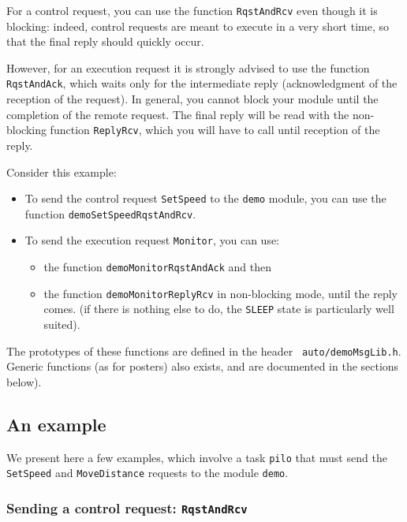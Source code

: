 For a  control request, you  can use  the function  {\tt RqstAndRcv} even
though it is blocking: indeed, control requests are meant to execute in a
very short time, so that the final reply should quickly occur.

However, for  an  execution request it   is strongly advised   to use the
function {\tt  RqstAndAck}, which waits only  for the  intermediate reply
(acknowledgment of the reception of the request).  In general, you cannot
block your module until the completion of the  remote request.  The final
reply will be  read with the  non-blocking function {\tt ReplyRcv}, which
you will have to call until reception of the reply.

Consider this example:

\begin{itemize}
\item To send the control request {\tt SetSpeed} to  the {\tt demo}
module, you can use the function {\tt demoSetSpeedRqstAndRcv}.

\item To send the execution request {\tt Monitor}, you can use:
   \begin{itemize}
      \item the function {\tt demoMonitorRqstAndAck} and then
      \item the function {\tt demoMonitorReplyRcv} in non-blocking mode,
until the reply comes. (if there is nothing else to do, the {\tt SLEEP}
state is particularly well suited).
   \end{itemize}
\end{itemize}

The prototypes  of  these  functions  are defined   in the  header   {\tt
auto/demoMsgLib.h}. Generic functions  (as for posters) also exists,
and are documented in the sections below).

\subsection{An example}

We  present here a few  examples, which involve  a task {\tt pilo} that
must send  the {\tt  SetSpeed} and   {\tt MoveDistance}  requests  to the
module {\tt demo}. 

\subsubsection{Sending a control request: {\tt RqstAndRcv}}

